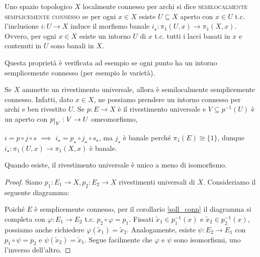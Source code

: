 \begin{defn}
  Uno spazio topologico $X$ localmente connesso per archi si dice \textsc{semilocalmente semplicemente connesso} se per ogni $x \in X$ esiste $U \subseteq X$ aperto con $x \in U$ t.c. l'inclusione $i:U \rightarrow X$ induce il morfismo banale $i_{\star}:\pi_1(U, x) \rightarrow \pi_1(X, x)$. Ovvero, per ogni $x \in X$ esiste un intorno $U$ di $x$ t.c. tutti i lacci basati in $x$ e contenuti in $U$ sono banali in $X$.
\end{defn}

Questa proprietà è verificata ad esempio se ogni punto ha un intorno semplicemente connesso (per esempio le varietà).

\begin{oss}
  Se $X$ ammette un rivestimento universale, allora è semilocalmente semplicemente connesso. Infatti, dato $x \in X$, ne possiamo prendere un intorno connesso per archi e ben rivestito $U$. Se $p:E \rightarrow X$ è il rivestimento universale e $V \subseteq p^{-1}(U)$ è un aperto con $p\restrict{V}:V \rightarrow U$ omeomorfismo,
  \begin{center}
  \end{center}
  $i=p \circ j \circ s$ $\implies$ $i_{\star}=p_{\star} \circ j_{\star} \circ s_{\star}$, ma $j_{\star}$ è banale perché $\pi_1(E) \cong \{1\}$, dunque $i_{\star}:\pi_1(U, x) \rightarrow \pi_1(X, x)$ è banale.
\end{oss}

\begin{lm}
  Quando esiste, il rivestimento universale è unico a meno di isomorfismo.
\end{lm}

\begin{proof}
  Siano $p_1:E_1 \rightarrow X, p_2:E_2 \rightarrow X$ rivestimenti universali di $X$. Consideriamo il seguente diagramma:
  \begin{center}
  \end{center}
  Poiché $E$ è semplicemente connesso, per il corollario \ref{soll_conn} il diagramma si completa con $\varphi:E_1 \rightarrow E_2$ t.c. $p_2 \circ \varphi=p_1$. Fissati $\tilde{x}_1 \in p_1^{-1}(x)$ e $\tilde{x}_2 \in p_2^{-1}(x)$, possiamo anche richiedere $\varphi(\tilde{x}_1)=\tilde{x}_2$.
  Analogamente, esiste $\psi:E_2 \rightarrow E_1$ con $p_1 \circ \psi=p_2$ e $\psi(\tilde{x}_2)=\tilde{x}_1$. Segue facilmente che $\varphi$ e $\psi$ sono isomorfismi, uno l'inverso dell'altro.
\end{proof}

